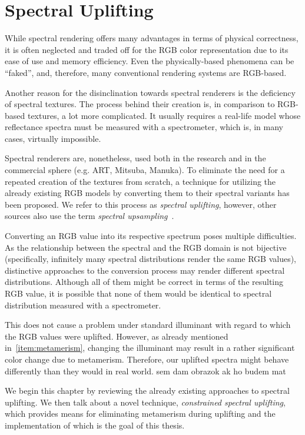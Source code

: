 \chapter{Spectral Uplifting} \label{chap:spectralUplifting}

While spectral rendering offers many advantages in terms of physical correctness, it is often neglected and traded off for the RGB color representation due to its ease of use and memory efficiency. Even the physically-based phenomena can be ``faked'', and, therefore, many conventional rendering systems are RGB-based. 

Another reason for the disinclination towards spectral renderers is the deficiency of spectral textures. The process behind their creation is, in comparison to RGB-based textures, a lot more complicated. It usually requires a real-life model whose reflectance spectra must be measured with a spectrometer, which is, in many cases, virtually impossible.  

Spectral renderers are, nonetheless, used both in the research and in the commercial sphere (e.g. ART, Mitsuba, Manuka). To eliminate the need for a repeated creation of the textures from scratch, a technique for utilizing the already existing RGB models by converting them to their spectral variants has been proposed. We refer to this process as \emph{spectral uplifting}, however, other sources also use the term \emph{spectral upsampling}~\cite{sigmoidMethod}.

Converting an RGB value into its respective spectrum poses multiple difficulties. As the relationship between the spectral and the RGB domain is not bijective (specifically, infinitely many spectral distributions render the same RGB values), distinctive approaches to the conversion process may render different spectral distributions. Although all of them might be correct in terms of the resulting RGB value, it is possible that none of them would be identical to spectral distribution measured with a spectrometer.

This does not cause a problem under standard illuminant with regard to which the RGB values were uplifted. However, as already mentioned in~\cref{item:metamerism}, changing the illuminant may result in a rather significant color change due to metamerism. Therefore, our uplifted spectra might behave differently than they would in real world. sem dam obrazok ak ho budem mat

We begin this chapter by reviewing the already existing approaches to spectral uplifting. We then talk about a novel technique, \emph{constrained spectral uplifting}, which provides means for eliminating metamerism during uplifting and the implementation of which is the goal of this thesis.

